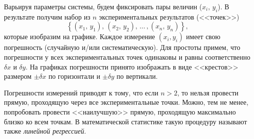 Варьируя параметры системы, будем фиксировать пары величин ($x_{i},\,y_{i}$).
В результате получим набор из $n$ экспериментальных результатов (<<точек>>)
\[
\left\{ (x_{1},\,y_{1}),\,(x_{2},\,y_{2}),\,\ldots\,,(x_{n},\,y_{n})\right\} ,
\]
которые изобразим на графике. Каждое измерение $\left(x_{i},y_{i}\right)$
имеет свою погрешность (случайную и/или систематическую). Для простоты
примем, что погрешности у всех экспериментальных точек одинаковы и
равны соответственно $\delta x$ и $\delta y$. На графиках погрешности
принято изображать в виде <<крестов>> размером
$\pm\delta x$ по горизонтали и $\pm\delta y$ по вертикали.

Погрешности измерений приводят к тому, что если $n>2$, то нельзя
провести прямую, проходящую через все экспериментальные точки. Можно,
тем не менее, попробовать провести <<наилучшую>>
прямую, проходящую максимально близко ко всем точкам. В математической
статистике такую процедуру называют также \emph{линейной регрессией}.

